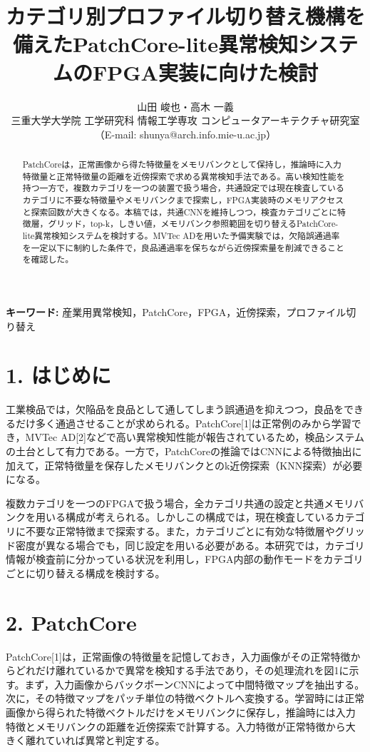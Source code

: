 \documentclass[a4paper,twocolumn,10pt]{ltjsarticle}
\title{\textbf{カテゴリ別プロファイル切り替え機構を備えたPatchCore-lite異常検知システムのFPGA実装に向けた検討}}
\author{山田 峻也・高木 一義\\ 三重大学大学院 工学研究科 情報工学専攻 コンピュータアーキテクチャ研究室\\ （E-mail: shunya@arch.info.mie-u.ac.jp）}
\date{}
\begin{document}
\maketitle
\begin{abstract}
PatchCoreは，正常画像から得た特徴量をメモリバンクとして保持し，推論時に入力特徴量と正常特徴量の距離を近傍探索で求める異常検知手法である。高い検知性能を持つ一方で，複数カテゴリを一つの装置で扱う場合，共通設定では現在検査しているカテゴリに不要な特徴量やメモリバンクまで探索し，FPGA実装時のメモリアクセスと探索回数が大きくなる。本稿では，共通CNNを維持しつつ，検査カテゴリごとに特徴層，グリッド，top-k，しきい値，メモリバンク参照範囲を切り替えるPatchCore-lite異常検知システムを検討する。MVTec ADを用いた予備実験では，欠陥誤通過率を一定以下に制約した条件で，良品通過率を保ちながら近傍探索量を削減できることを確認した。
\end{abstract}
\noindent\textbf{キーワード:} 産業用異常検知，PatchCore，FPGA，近傍探索，プロファイル切り替え
\section*{1. はじめに}
工業検品では，欠陥品を良品として通してしまう誤通過を抑えつつ，良品をできるだけ多く通過させることが求められる。PatchCore[1]は正常例のみから学習でき，MVTec AD[2]などで高い異常検知性能が報告されているため，検品システムの土台として有力である。一方で，PatchCoreの推論ではCNNによる特徴抽出に加えて，正常特徴量を保存したメモリバンクとのk近傍探索（KNN探索）が必要になる。

複数カテゴリを一つのFPGAで扱う場合，全カテゴリ共通の設定と共通メモリバンクを用いる構成が考えられる。しかしこの構成では，現在検査しているカテゴリに不要な正常特徴まで探索する。また，カテゴリごとに有効な特徴層やグリッド密度が異なる場合でも，同じ設定を用いる必要がある。本研究では，カテゴリ情報が検査前に分かっている状況を利用し，FPGA内部の動作モードをカテゴリごとに切り替える構成を検討する。

\section*{2. PatchCore}
PatchCore[1]は，正常画像の特徴量を記憶しておき，入力画像がその正常特徴からどれだけ離れているかで異常を検知する手法であり，その処理流れを図1に示す。まず，入力画像からバックボーンCNNによって中間特徴マップを抽出する。次に，その特徴マップをパッチ単位の特徴ベクトルへ変換する。学習時には正常画像から得られた特徴ベクトルだけをメモリバンクに保存し，推論時には入力特徴とメモリバンクの距離を近傍探索で計算する。入力特徴が正常特徴から大きく離れていれば異常と判定する。
\end{document}
